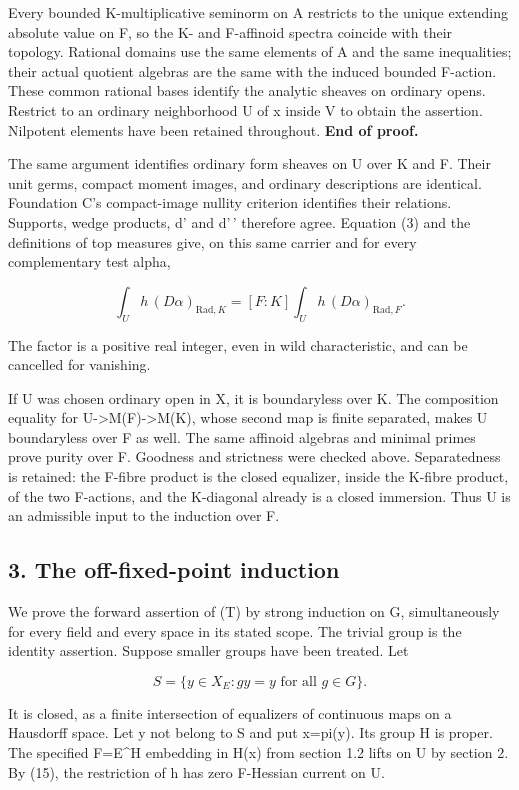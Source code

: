 \documentclass[
  10pt,
]{article}
\begin{document}
Every bounded K-multiplicative seminorm on A restricts to the unique
extending absolute value on F, so the K- and F-affinoid spectra coincide
with their topology. Rational domains use the same elements of A and the
same inequalities; their actual quotient algebras are the same with the
induced bounded F-action. These common rational bases identify the
analytic sheaves on ordinary opens. Restrict to an ordinary neighborhood
U of x inside V to obtain the assertion. Nilpotent elements have been
retained throughout. \textbf{End of proof.}

The same argument identifies ordinary form sheaves on U over K and F.
Their unit germs, compact moment images, and ordinary descriptions are
identical. Foundation C's compact-image nullity criterion identifies
their relations. Supports, wedge products, d' and d'\,' therefore agree.
Equation (3) and the definitions of top measures give, on this same
carrier and for every complementary test alpha,

\[
 \int_U h\,(D\alpha)_{\mathrm{Rad},K}
 =[F:K]\int_U h\,(D\alpha)_{\mathrm{Rad},F}.                 \tag{15}
\]

The factor is a positive real integer, even in wild characteristic, and
can be cancelled for vanishing.

If U was chosen ordinary open in X, it is boundaryless over K. The
composition equality for U-\textgreater M(F)-\textgreater M(K), whose
second map is finite separated, makes U boundaryless over F as well. The
same affinoid algebras and minimal primes prove purity over F. Goodness
and strictness were checked above. Separatedness is retained: the
F-fibre product is the closed equalizer, inside the K-fibre product, of
the two F-actions, and the K-diagonal already is a closed immersion.
Thus U is an admissible input to the induction over F.

\subsection{3. The off-fixed-point
induction}\label{the-off-fixed-point-induction}

We prove the forward assertion of (T) by strong induction on
\textbar G\textbar, simultaneously for every field and every space in
its stated scope. The trivial group is the identity assertion. Suppose
smaller groups have been treated. Let

\[
 S=\{y\in X_E:g y=y\text{ for all }g\in G\}.
\]

It is closed, as a finite intersection of equalizers of continuous maps
on a Hausdorff space. Let y not belong to S and put x=pi(y). Its group H
is proper. The specified F=E\^{}H embedding in H(x) from section 1.2
lifts on U by section 2. By (15), the restriction of h has zero
F-Hessian current on U.
\end{document}
